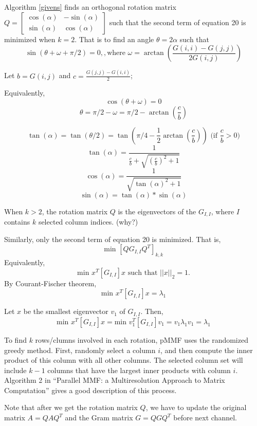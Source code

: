 \documentclass[a4paper]{article}
\begin{document}
Algorithm \ref{givens} finds an orthogonal rotation matrix $Q = \begin{bmatrix}
\cos(\alpha) & -\sin(\alpha) \\
\sin(\alpha)  & \cos(\alpha)
\end{bmatrix}$
 such that the second term of equation 20 is minimized when $k = 2$. That is to find an angle $\theta = 2\alpha$ such that $$\sin(\theta + \omega +\pi/2) = 0,, \text{where } \omega = \arctan(\frac{G(i,i) - G(j,j)}{2G(i,j)})$$
 
 Let $b = G(i, j)$ and $c = \frac{G(j, j) - G(i, i)}{2}$;
 
 Equivalently,
 $$\cos(\theta + \omega) = 0$$
 $$\theta = \pi/2-\omega = \pi/2 - \arctan(\frac{c}{b})$$
 
$$\tan(\alpha) = \tan(\theta/2) = \tan(\pi/4 - \frac{1}{2}\arctan(\frac{c}{b})) \text{     (if }\frac{c}{b}>0)$$
$$\tan(\alpha) = \frac{1}{\frac{c}{b} + \sqrt{(\frac{c}{b})^2 +1}}$$
$$\cos(\alpha) = \frac{1}{\sqrt{\tan(\alpha)^2 + 1}}$$
$$\sin(\alpha) = \tan(\alpha)*\sin(\alpha)$$

When $k>2$, the rotation matrix $Q$ is the eigenvectors of the $G_{I,I}$, where $I$ contains $k$ selected column indices. (why?)

Similarly, only the second term of equation 20 is minimized. That is,
$$\text{min } [QG_{I,I}Q^T]_{k,k}$$
Equivalently, $$\text{min } x^T[G_{I,I}]x \text{ such that } ||x||_2 = 1.$$
By Courant-Fischer theorem, $$\text{min } x^T[G_{I,I}]x = \lambda_1$$

Let $x$ be the smallest eigenvector $v_1$ of $G_{I,I}$. Then,
$$\text{min } x^T[G_{I,I}]x = \text{min } v_1^T[G_{I,I}]v_1 = v_1\lambda_1v_1 = \lambda_1$$


To find $k$ rows/clumns involved in each rotation, pMMF uses the randomized greedy method. First, randomly select a column $i$, and then compute the inner product of this column with all other columns. The selected column set will include $k-1$ columns that have the largest inner products with column $i$. Algorithm 2 in ``Parallel MMF: a Multiresolution Approach to Matrix Computation'' gives a good description of this process.

Note that after we get the rotation matrix $Q$, we have to update the original matrix $A= QAQ^T$ and the Gram matrix $G = QGQ^T$ before next channel.
\end{document}
